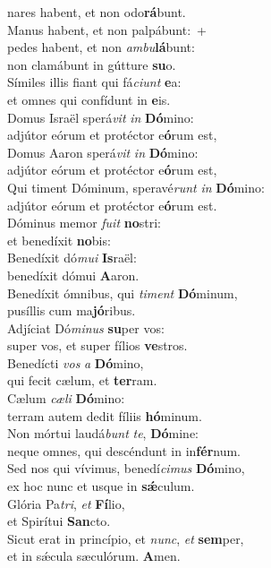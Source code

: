 \evenverse nares habent, et non odo\textbf{rá}bunt.\\
\oddverse Manus habent, et non palpábunt:~+\\
\oddverse  pedes habent, et non \textit{am}\textit{bu}\textbf{lá}bunt:~\*\\
\oddverse non clamábunt in gútture \textbf{su}o.\\
\evenverse Símiles illis fiant qui fá\textit{ci}\textit{unt} \textbf{e}a:~\*\\
\evenverse et omnes qui confídunt in \textbf{e}is.\\
\oddverse Domus Israël sperá\textit{vit} \textit{in} \textbf{Dó}mino:~\*\\
\oddverse adjútor eórum et protéctor e\textbf{ó}rum est,\\
\evenverse Domus Aaron sperá\textit{vit} \textit{in} \textbf{Dó}mino:~\*\\
\evenverse adjútor eórum et protéctor e\textbf{ó}rum est,\\
\oddverse Qui timent Dóminum, speravé\textit{runt} \textit{in} \textbf{Dó}mino:~\*\\
\oddverse adjútor eórum et protéctor e\textbf{ó}rum est.\\
\evenverse Dóminus memor \textit{fu}\textit{it} \textbf{no}stri:~\*\\
\evenverse et benedíxit \textbf{no}bis:\\
\oddverse Benedíxit dó\textit{mu}\textit{i} \textbf{Is}raël:~\*\\
\oddverse benedíxit dómui \textbf{A}aron.\\
\evenverse Benedíxit ómnibus, qui \textit{ti}\textit{ment} \textbf{Dó}minum,~\*\\
\evenverse pusíllis cum ma\textbf{jó}ribus.\\
\oddverse Adjíciat Dó\textit{mi}\textit{nus} \textbf{su}per vos:~\*\\
\oddverse super vos, et super fílios \textbf{ve}stros.\\
\evenverse Benedícti \textit{vos} \textit{a} \textbf{Dó}mino,~\*\\
\evenverse qui fecit cælum, et \textbf{ter}ram.\\
\oddverse Cælum \textit{cæ}\textit{li} \textbf{Dó}mino:~\*\\
\oddverse terram autem dedit fíliis \textbf{hó}minum.\\
\evenverse Non mórtui laudá\textit{bunt} \textit{te}, \textbf{Dó}mine:~\*\\
\evenverse neque omnes, qui descéndunt in in\textbf{fér}num.\\
\oddverse Sed nos qui vívimus, benedí\textit{ci}\textit{mus} \textbf{Dó}mino,~\*\\
\oddverse ex hoc nunc et usque in \textbf{sǽ}culum.\\
\evenverse Glória Pa\textit{tri}, \textit{et} \textbf{Fí}lio,~\*\\
\evenverse et Spirítui \textbf{San}cto.\\
\oddverse Sicut erat in princípio, et \textit{nunc}, \textit{et} \textbf{sem}per,~\*\\
\oddverse et in sǽcula sæculórum. \textbf{A}men.\\
